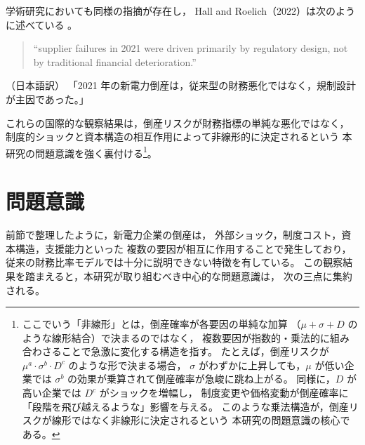 学術研究においても同様の指摘が存在し，
Hall and Roelich（2022）は次のように述べている \parencite{HallRoelich2022EnergyPolicy}。
\begin{quote}
“supplier failures in 2021 were driven primarily by regulatory design, not by traditional financial deterioration.”
\end{quote}
（日本語訳）  
「2021 年の新電力倒産は，従来型の財務悪化ではなく，規制設計が主因であった。」

\vspace{1\baselineskip}

これらの国際的な観察結果は，倒産リスクが財務指標の単純な悪化ではなく，
制度的ショックと資本構造の相互作用によって非線形的に決定されるという
本研究の問題意識を強く裏付ける\footnote{
ここでいう「非線形」とは，倒産確率が各要因の単純な加算
（$\mu+\sigma+D$ のような線形結合）で決まるのではなく，
複数要因が指数的・乗法的に組み合わさることで急激に変化する構造を指す。
たとえば，倒産リスクが $\mu^a \cdot \sigma^b \cdot D^c$ のような形で決まる場合，
$\sigma$ がわずかに上昇しても，$\mu$ が低い企業では
$\sigma^b$ の効果が乗算されて倒産確率が急峻に跳ね上がる。
同様に，$D$ が高い企業では $D^c$ がショックを増幅し，
制度変更や価格変動が倒産確率に「段階を飛び越えるような」影響を与える。
このような乗法構造が，倒産リスクが線形ではなく非線形に決定されるという
本研究の問題意識の核心である。}。




\section{問題意識}

前節で整理したように，新電力企業の倒産は，
外部ショック，制度コスト，資本構造，支援能力といった
複数の要因が相互に作用することで発生しており，
従来の財務比率モデルでは十分に説明できない特徴を有している。
この観察結果を踏まえると，本研究が取り組むべき中心的な問題意識は，
次の三点に集約される。

